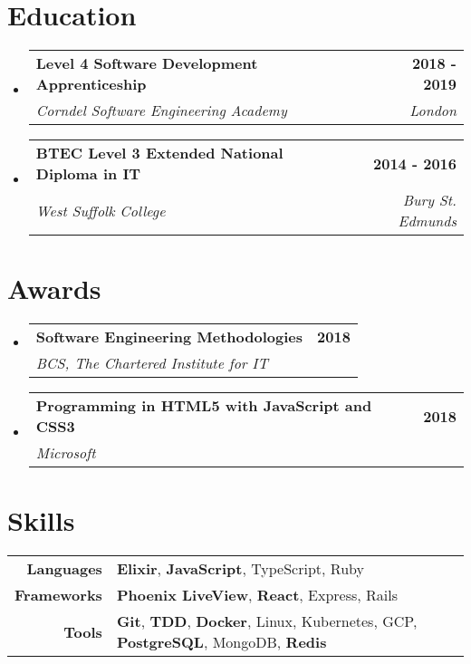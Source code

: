 \documentclass[a4paper,10pt]{article}
\makeatletter
\newcommand{\resumeSubheading}[4]{
  \vspace{2pt}\item
    \begin{tabular*}{1.0\textwidth}[t]{l@{\extracolsep{\fill}}r}
      \textbf{#1} & \textbf{\small #2} \\
      \textit{\small#3} & \textit{\small #4} \\
    \end{tabular*}\vspace{-7pt}
}
\newcommand{\resumeSubHeadingListStart}{\begin{itemize}[leftmargin=0.0in, label={}]}
\newcommand{\resumeSubHeadingListEnd}{\end{itemize}}
\makeatother
\begin{document}
\section{Education}
  \resumeSubHeadingListStart
    \resumeSubheading
      {Level 4 Software Development Apprenticeship}{2018 - 2019}
      {Corndel Software Engineering Academy}{London}

    \resumeSubheading
      {BTEC Level 3 Extended National Diploma in IT}{2014 - 2016}
      {West Suffolk College}{Bury St. Edmunds}
  \resumeSubHeadingListEnd
\vspace{8pt}

\section{Awards}
  \resumeSubHeadingListStart
    \resumeSubheading
      {Software Engineering Methodologies}{2018}
      {BCS, The Chartered Institute for IT}{}

    \resumeSubheading
      {Programming in HTML5 with JavaScript and CSS3}{2018}
      {Microsoft}{}
  \resumeSubHeadingListEnd
\vspace{8pt}

\centering

\section{Skills}
\begin{tabular}{rl}
    \textbf{Languages} & \textbf{Elixir}, \textbf{JavaScript}, TypeScript, Ruby \\
    \textbf{Frameworks} & \textbf{Phoenix LiveView}, \textbf{React}, Express, Rails \\
    \textbf{Tools} &  \textbf{Git}, \textbf{TDD}, \textbf{Docker}, Linux, Kubernetes, GCP, \textbf{PostgreSQL}, MongoDB, \textbf{Redis} \\
\end{tabular}
\end{document}

